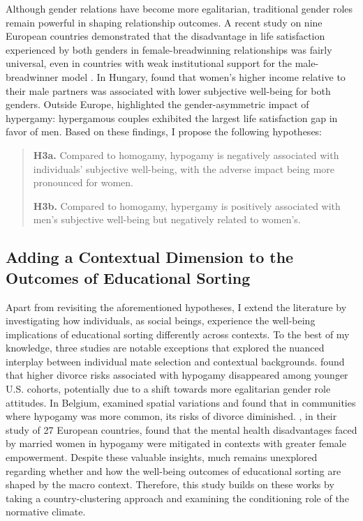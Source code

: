Although gender relations have become more egalitarian, traditional gender roles remain powerful in shaping relationship outcomes. A recent study on nine European countries demonstrated that the disadvantage in life satisfaction experienced by both genders in female-breadwinning relationships was fairly universal, even in countries with weak institutional support for the male-breadwinner model \parencite{kowalewskaFemalebreadwinnerWellbeingPenalty2023}. In Hungary, \textcite{hajduIntraCoupleIncomeDistribution2018} found that women's higher income relative to their male partners was associated with lower subjective well-being for both genders. Outside Europe, \textcite{booysenIntermarriageSubjectiveSocial2022} highlighted the gender-asymmetric impact of hypergamy: hypergamous couples exhibited the largest life satisfaction gap in favor of men. Based on these findings, I propose the following hypotheses:

\begin{quote}
    \textbf{H3a.} Compared to homogamy, hypogamy is negatively associated with individuals' subjective well-being, with the adverse impact being more pronounced for women.

    \textbf{H3b.} Compared to homogamy, hypergamy is positively associated with men's subjective well-being but negatively related to women's.
\end{quote}

\subsection{Adding a Contextual Dimension to the Outcomes of Educational Sorting}

Apart from revisiting the aforementioned hypotheses, I extend the literature by investigating how individuals, as social beings, experience the well-being implications of educational sorting differently across contexts. To the best of my knowledge, three studies are notable exceptions that explored the nuanced interplay between individual mate selection and contextual backgrounds. \textcite{schwartzReversalGenderGap2014} found that higher divorce risks associated with hypogamy disappeared among younger U.S. cohorts, potentially due to a shift towards more egalitarian gender role attitudes. In Belgium, \textcite{theunisHisHerEducation2018} examined spatial variations and found that in communities where hypogamy was more common, its risks of divorce diminished. \textcite{potarcaAreWomenHypogamous2022}, in their study of 27 European countries, found that the mental health disadvantages faced by married women in hypogamy were mitigated in contexts with greater female empowerment. Despite these valuable insights, much remains unexplored regarding whether and how the well-being outcomes of educational sorting are shaped by the macro context. Therefore, this study builds on these works by taking a country-clustering approach and examining the conditioning role of the normative climate.

